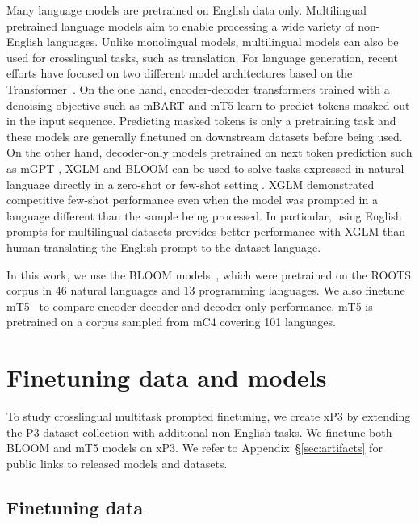 \documentclass[11pt]{article}
\begin{document}
Many language models are pretrained on English data only. Multilingual pretrained language models \cite{lample2019,conneau2019unsupervised,fan2021beyond} aim to enable processing a wide variety of non-English languages. Unlike monolingual models, multilingual models can also be used for crosslingual tasks, such as translation. For language generation, recent efforts have focused on two different model architectures based on the Transformer~\cite{vaswani2017attention}. On the one hand, encoder-decoder transformers trained with a denoising objective such as mBART \cite{liu2020multilingual} and mT5 \cite{xue2020mt5} learn to predict tokens masked out in the input sequence. Predicting masked tokens is only a pretraining task and these models are generally finetuned on downstream datasets before being used. On the other hand, decoder-only models pretrained on next token prediction such as mGPT \cite{shliazhko2022mgpt}, XGLM \cite{lin2021few} and BLOOM \cite{scao2022bloom} can be used to solve tasks expressed in natural language directly in a zero-shot or few-shot setting \cite{gpt3}. XGLM demonstrated competitive few-shot performance even when the model was prompted in a language different than the sample being processed. In particular, using English prompts for multilingual datasets provides better performance with XGLM than human-translating the English prompt to the dataset language. 

In this work, we use the BLOOM models~\cite{scao2022bloom,scao2022language}, which were pretrained on the ROOTS corpus \cite{laurencconbigscience} in 46 natural languages and 13 programming languages. We also finetune mT5~\cite{xue2020mt5} to compare encoder-decoder and decoder-only performance. mT5 is pretrained on a corpus sampled from mC4 covering 101 languages.


\section{Finetuning data and models}

To study crosslingual multitask prompted finetuning, we create xP3 by extending the P3 dataset collection with additional non-English tasks. We finetune both BLOOM and mT5 models on xP3. We refer to Appendix~\S\ref{sec:artifacts} for public links to released models and datasets. 

\subsection{Finetuning data}
\end{document}
